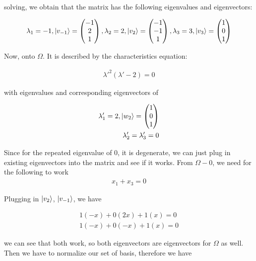 \documentclass{article}
\begin{document}
solving, we obtain that the matrix has the following eigenvalues and eigenvectors:

\begin{align}
    \lambda_1 = -1, \ket{v_{-1}} = \begin{pmatrix}
        -1 \\ 2 \\1
    \end{pmatrix},
    \lambda_2 = 2, \ket{v_2} = \begin{pmatrix}
        -1 \\ -1 \\ 1
    \end{pmatrix},
    \lambda_3 = 3, \ket{v_3} = \begin{pmatrix}
        1 \\ 0 \\ 1
    \end{pmatrix}
\end{align}

Now, onto $\Omega$. It is described by the characteristics equation:

\begin{align}
    \lambda'^2 (\lambda'-2) = 0
\end{align}

with eigenvalues and corresponding eigenvectors of 

\begin{align}
    \lambda'_1 = 2, \ket{w_2} = \begin{pmatrix}
        1 \\ 0 \\ 1
    \end{pmatrix} \\
    \lambda'_2 = \lambda'_3 = 0
\end{align}

Since for the repeated eigenvalue of 0, it is degenerate, we can just plug in existing eigenvectors into the matrix and see if it works. From $\Omega - 0$, we need for the following to work
\begin{align}
    x_1 + x_3 = 0
\end{align}

Plugging in $\ket{v_2}$, $\ket{v_{-1}}$, we have

\begin{align}
    1(-x) + 0(2x) + 1(x) = 0 \\
    1(-x) + 0(-x) + 1(x) = 0 
\end{align}

we can see that both work, so both eigenvectors are eigenvectors for $\Omega$ as well. Then we have to normalize our set of basis, therefore we have
\end{document}
